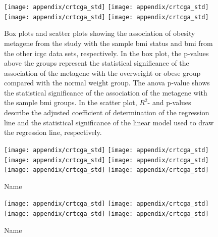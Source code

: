 \begin{appendices}
	\begin{figure}[htpb]
		\centering
		\texttt{[image: appendix/crtcga\_std]}
		\hfill
		\texttt{[image: appendix/crtcga\_std]}\\
		\texttt{[image: appendix/crtcga\_std]}
		\hfill
		\texttt{[image: appendix/crtcga\_std]}\\
		\caption{Box plots and scatter plots showing the association of obesity metagene from the \citet{Creighton2012} study with the sample \gls{bmi} status  and \gls{bmi} from the other \gls{icgc} data sets, respectively.
	In the box plot, the p-values above the groups represent the statistical significance of the association of the metagene with the overweight or obese group compared with the normal weight group.
	The \gls{anova} p-value shows the statistical significance of the association of the metagene with the sample \gls{bmi} groups.
	In the scatter plot, $R^2$- and p-values describe the adjusted coefficient of determination of the regression line and the statistical significance of the linear model used to draw the regression line, respectively.}
		\label{fig:appendix/cr_icgc_box_scatter}
	\end{figure}

	\begin{figure}[htpb]
		\ContinuedFloat
		\captionsetup{list=off,format=cont}
		\centering
		\texttt{[image: appendix/crtcga\_std]}
		\hfill
		\texttt{[image: appendix/crtcga\_std]}\\
		\texttt{[image: appendix/crtcga\_std]}
		\hfill
		\texttt{[image: appendix/crtcga\_std]}\\
		\texttt{[image: appendix/crtcga\_std]}
		\hfill
		\texttt{[image: appendix/crtcga\_std]}\\
		\caption{Name}
	\end{figure}

	\begin{figure}[htpb]
		\ContinuedFloat
		\captionsetup{list=off,format=cont}
		\centering
		\texttt{[image: appendix/crtcga\_std]}
		\hfill
		\texttt{[image: appendix/crtcga\_std]}\\
		\texttt{[image: appendix/crtcga\_std]}
		\hfill
		\texttt{[image: appendix/crtcga\_std]}\\
		\caption{Name}
	\end{figure}


\end{appendices}
